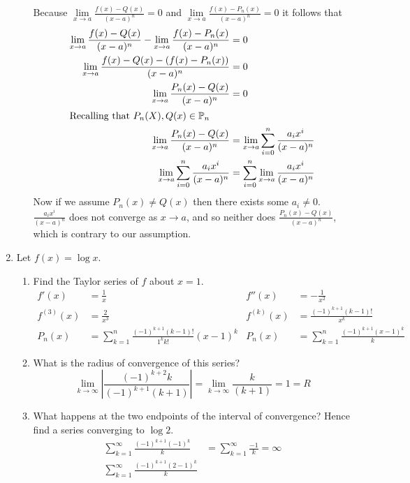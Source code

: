 \documentclass[letterpaper]{article}
\begin{document}
\begin{enumerate}
\begin{enumerate}
  Because $\lim\limits_{x\to a}\frac{f(x)-Q(x)}{(x-a)^n}=0$
  and $\lim\limits_{x\to a}\frac{f(x)-P_n(x)}{(x-a)^n}=0$ it follows that
  \begin{align*}
    \lim\limits_{x\to a}\frac{f(x)-Q(x)}{(x-a)^n}-\lim\limits_{x\to a}\frac{f(x)-P_n(x)}{(x-a)^n}&=0\\
    \lim\limits_{x\to a}\frac{f(x)-Q(x)-(f(x)-P_n(x))}{(x-a)^n}&=0\\
    \lim\limits_{x\to a}\frac{P_n(x)-Q(x)}{(x-a)^n}&=0\\
    \intertext{Recalling that $P_n(X),Q(x)\in\mathbb{P}_n$}
    \lim\limits_{x\to a}\frac{P_n(x)-Q(x)}{(x-a)^n}
    &=\lim\limits_{x\to a}\sum\limits_{i=0}^n{\frac{a_ix^i}{(x-a)^n}}\\
    \lim\limits_{x\to a}\sum\limits_{i=0}^n{\frac{a_ix^i}{(x-a)^n}}
    &=\sum\limits_{i=0}^n{\lim\limits_{x\to a}\frac{a_ix^i}{(x-a)^n}}\\
  \end{align*}
  Now if we assume $P_n(x)\ne Q(x)$ then there exists some $a_i\ne 0$. $\frac{a_ix^i}{(x-a)^n}$ does not converge as $x\to a$, and so neither does $\frac{P_n(x)-Q(x)}{(x-a)^n}$, which is contrary to our assumption.
  \end{enumerate}
\setcounter{enumi}{5}
\item
Let $f(x)=\log x$.
  \begin{enumerate}
  \item
  Find the Taylor series of $f$ about $x=1$.
  \begin{align*}
    f'(x)&=\frac{1}{x}&
    f''(x)&=-\frac{1}{x^2}\\
    f^{(3)}(x)&=\frac{2}{x^3}&
    f^{(k)}(x)&=\frac{(-1)^{k+1}(k-1)!}{x^k}\\
    P_n(x)&=\sum\limits_{k=1}^n{\frac{(-1)^{k+1}(k-1)!}{1^kk!}(x-1)^k}&
    P_n(x)&=\sum\limits_{k=1}^n{\frac{(-1)^{k+1}(x-1)^k}{k}}
  \end{align*}
  \item
  What is the radius of convergence of this series?
  \[\lim\limits_{k\to\infty}\left\lvert\frac{(-1)^{k+2}k}{(-1)^{k+1}(k+1)}\right\rvert
  =\lim\limits_{k\to\infty}\frac{k}{(k+1)}=1=R \]
  \item
  What happens at the two endpoints of the interval of convergence? Hence find a series converging to $\log 2$.
  \begin{align*}
    \sum\limits_{k=1}^\infty{\frac{(-1)^{k+1}(-1)^k}{k}}
    &=\sum\limits_{k=1}^\infty{\frac{-1}{k}}=\infty\\
    \sum\limits_{k=1}^\infty{\frac{(-1)^{k+1}(2-1)^k}{k}}

\end{align*}
\end{enumerate}
\end{enumerate}
\end{document}
